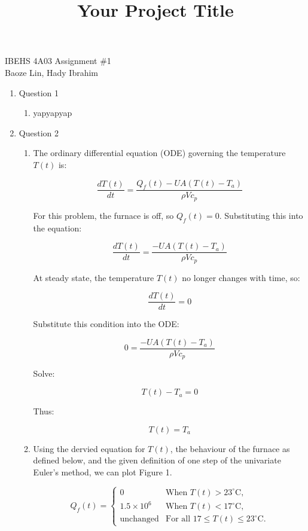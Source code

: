 \documentclass[12pt]{article}
\title{Your Project Title}
\begin{document}
IBEHS 4A03 \hfill Assignment \#1\\
Baoze Lin, Hady Ibrahim

\hrulefill

\renewcommand{\theenumii}{\arabic{enumi}.\arabic{enumii}}

\begin{enumerate}
\item Question 1
  \begin{enumerate}
  \item yapyapyap

  \end{enumerate}
\newpage

\item Question 2
  \begin{enumerate}
  \item 

  The ordinary differential equation (ODE) governing the temperature \( T(t) \) is:

  \[
  \frac{dT(t)}{dt} = \frac{Q_f(t) - UA(T(t) - T_a)}{\rho V c_p}
  \]

  For this problem, the furnace is off, so \( Q_f(t) = 0 \). Substituting this into the equation:

  \[
  \frac{dT(t)}{dt} = \frac{-UA(T(t) - T_a)}{\rho V c_p}
  \]

  At steady state, the temperature \( T(t) \) no longer changes with time, so:

  \[
  \frac{dT(t)}{dt} = 0
  \]

  Substitute this condition into the ODE:

  \[
  0 = \frac{-UA(T(t) - T_a)}{\rho V c_p}
  \]

  Solve:

  \[
  T(t) - T_a = 0
  \]

  Thus:

  \[
  T(t) = T_a
  \]

  \item 
    Using the dervied equation for \( T(t) \), the behaviour of the furnace as defined below, and the given definition of one step of the univariate Euler's method, we can plot Figure 1.

  \[
  Q_f(t) =
  \begin{cases} 
  0 & \text{When } T(t) > 23^\circ \text{C}, \\
  1.5 \times 10^6 & \text{When } T(t) < 17^\circ \text{C}, \\
  \text{unchanged} & \text{For all } 17 \leq T(t) \leq 23^\circ \text{C}.
  \end{cases}
  \]


\end{enumerate}
\end{enumerate}
\end{document}
